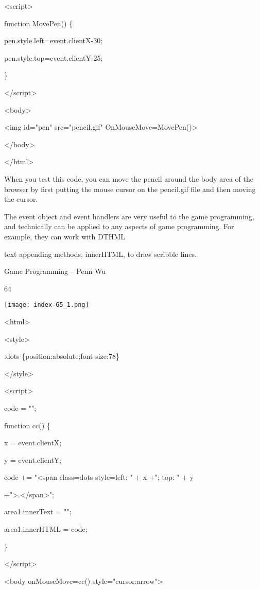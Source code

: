 \documentclass[
]{article}
\begin{document}
\textless script\textgreater{}

function MovePen() \{

pen.style.left=event.clientX-30;

pen.style.top=event.clientY-25;

\}

\textless/script\textgreater{}

\textless body\textgreater{}

\textless img id="pen" src="pencil.gif"
OnMouseMove=MovePen()\textgreater{}

\textless/body\textgreater{}

\textless/html\textgreater{}

When you test this code, you can move the pencil around the body area of
the browser by first putting the mouse cursor on the pencil.gif file and
then moving the cursor.

The event object and event handlers are very useful to the game
programming, and technically can be applied to any aspects of game
programming. For example, they can work with DTHML

text appending methods, innerHTML, to draw scribble lines.

Game Programming -- Penn Wu

64

\protect\hypertarget{index_split_005.htmlux5cux23p65}{}{}\texttt{[image: index-65\_1.png]}

\textless html\textgreater{}

\textless style\textgreater{}

.dots \{position:absolute;font-size:78\}

\textless/style\textgreater{}

\textless script\textgreater{}

code = "";

function cc() \{

x = event.clientX;

y = event.clientY;

code += "\textless span class=dots style=\textquotesingle left: " + x
+"; top: " + y

+"\textquotesingle\textgreater.\textless/span\textgreater";

area1.innerText = "";

area1.innerHTML = code;

\}

\textless/script\textgreater{}

\textless body onMouseMove=cc() style="cursor:arrow"\textgreater{}
\end{document}
